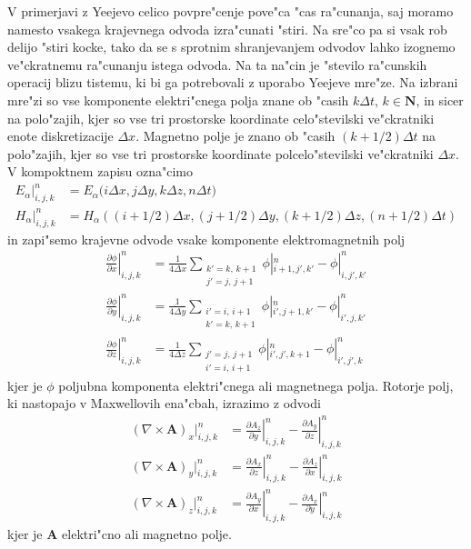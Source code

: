 \documentclass[12pt,twoside,openright,final,a4paper]{report}
\renewcommand{\vec}{\mathbf}
\begin{document}
V primerjavi z Yeejevo celico povpre"cenje pove"ca "cas ra"cunanja, saj moramo namesto vsakega krajevnega odvoda izra"cunati "stiri. 
Na sre"co pa si vsak rob delijo "stiri kocke, tako da se s sprotnim shranjevanjem odvodov lahko izognemo ve"ckratnemu ra"cunanju istega odvoda. 
Na ta na"cin je "stevilo ra"cunskih operacij blizu tistemu, ki bi ga potrebovali z uporabo Yeejeve mre"ze. Na izbrani mre"zi so vse komponente elektri"cnega polja znane ob "casih $k\Delta t$, $k\in\mathbf{N}$, in sicer na polo"zajih, kjer so vse tri prostorske koordinate celo"stevilski ve"ckratniki enote diskretizacije $\Delta x$. 
Magnetno polje je znano ob "casih $(k+1/2)\Delta t$ na polo"zajih, kjer so vse tri prostorske koordinate polcelo"stevilski ve"ckratniki $\Delta x$. 
V kompoktnem zapisu ozna"cimo
\begin{align}
 E_\alpha|_{i,j,k}^n &= E_\alpha\Big(i\Delta x, j\Delta y, k\Delta z, n \Delta t\Big) \\
 H_\alpha|_{i,j,k}^n &= H_\alpha\left(\left(i+1/2\right)\Delta x, \left(j+1/2\right)\Delta y, \left(k+1/2\right)\Delta z, \left(n+1/2\right) \Delta t\right)
\end{align}
in zapi"semo krajevne odvode vsake komponente elektromagnetnih polj
\newcommand{\sumij}[2]{\substack{ #1' = #1,\, #1+1 \\ #2' = #2,\, #2+1}}
\begin{align}
 \label{eq:diskretni-odvodi}
 \left.\frac{\partial \phi}{\partial x}\right|_{i,j,k}^n &= \frac{1}{4\Delta x}\sum_{\sumij{k}{j}} \phi|_{i+1,j',k'}^{n} - \phi|_{i,j',k'}^{n} \\
 \left.\frac{\partial \phi}{\partial y}\right|_{i,j,k}^n &= \frac{1}{4\Delta y}\sum_{\sumij{i}{k}} \phi|_{i',j+1,k'}^{n} - \phi|_{i',j,k'}^{n} \\
 \left.\frac{\partial \phi}{\partial z}\right|_{i,j,k}^n &= \frac{1}{4\Delta z}\sum_{\sumij{j}{i}} \phi|_{i',j',k+1}^{n} - \phi|_{i',j',k}^{n}	
\end{align}
kjer je $\phi$ poljubna komponenta elektri"cnega ali magnetnega polja.
Rotorje polj, ki nastopajo v Maxwellovih ena"cbah, izrazimo z odvodi
\begin{align}
 \label{eq:diskretni-rotor}
 (\nabla\times\vec A)_x|_{i,j,k}^n &= \left.\frac{\partial A_z}{\partial y}\right|_{i,j,k}^n - \left.\frac{\partial A_y}{\partial z}\right|_{i,j,k}^n\\
 (\nabla\times\vec A)_y|_{i,j,k}^n &= \left.\frac{\partial A_x}{\partial z}\right|_{i,j,k}^n - \left.\frac{\partial A_z}{\partial x}\right|_{i,j,k}^n\\
 (\nabla\times\vec A)_z|_{i,j,k}^n &= \left.\frac{\partial A_y}{\partial x}\right|_{i,j,k}^n - \left.\frac{\partial A_x}{\partial y}\right|_{i,j,k}^n
\end{align}
kjer je $\vec A$ elektri"cno ali magnetno polje. 
\end{document}
